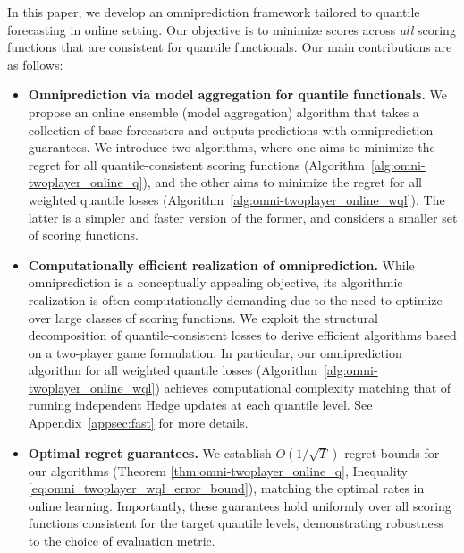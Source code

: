 

In this paper, we develop an omniprediction framework tailored to quantile forecasting in online setting. Our objective is to minimize scores across \emph{all} scoring functions that are consistent for quantile functionals. Our main contributions are as follows:

\begin{itemize}
    \item \textbf{Omniprediction via model aggregation for quantile functionals.}
    We propose an online ensemble (model aggregation) algorithm that takes a collection of base forecasters and outputs predictions with omniprediction guarantees. We introduce two algorithms, where one aims to minimize the regret for all quantile-consistent scoring functions (Algorithm~\ref{alg:omni-twoplayer_online_q}), and the other aims to minimize the regret for all weighted quantile losses (Algorithm~\ref{alg:omni-twoplayer_online_wql}). The latter is a simpler and faster version of the former, and considers a smaller set of scoring functions. 

    \item \textbf{Computationally efficient realization of omniprediction.}
    While omniprediction is a conceptually appealing objective, its algorithmic realization is often computationally demanding due to the need to optimize over large classes of scoring functions. We exploit the structural decomposition of quantile-consistent losses to derive efficient algorithms based on a two-player game formulation. In particular, our omniprediction algorithm for all weighted quantile losses (Algorithm~\ref{alg:omni-twoplayer_online_wql}) achieves computational complexity matching that of running independent Hedge updates at each quantile level. See Appendix~\ref{appsec:fast} for more details.

    \item \textbf{Optimal regret guarantees.}
    We establish $O(1/\sqrt{T})$ regret bounds for our algorithms (Theorem \ref{thm:omni-twoplayer_online_q}, Inequality \eqref{eq:omni_twoplayer_wql_error_bound}), matching the optimal rates in online learning. Importantly, these guarantees hold uniformly over all scoring functions consistent for the target quantile levels, demonstrating robustness to the choice of evaluation metric.


\end{itemize}
